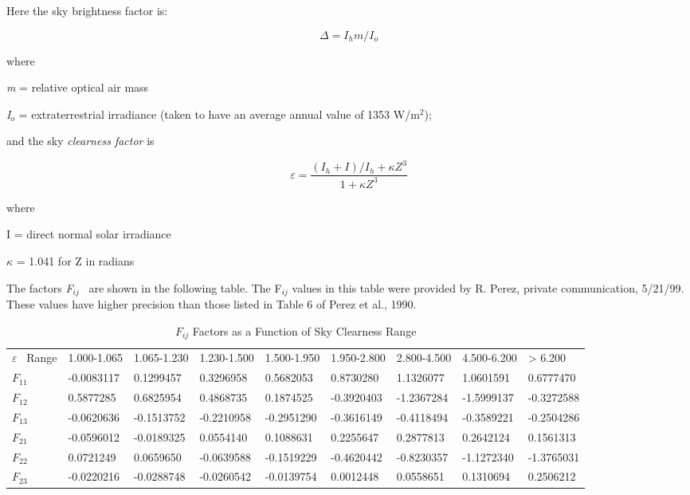 Here the sky brightness factor is:

\begin{equation}
\Delta  = {I_h}m/{I_o}
\end{equation}

where

\emph{m} = relative optical air mass

\emph{I\(_{o}\)} = extraterrestrial irradiance (taken to have an average annual value of 1353 W/m\(^{2}\));

and the sky \emph{clearness factor} is

\begin{equation}
\varepsilon  = \frac{{({I_h} + I)/{I_h} + \kappa {Z^3}}}{{1 + \kappa {Z^3}}}
\end{equation}

where

I = direct normal solar irradiance

$\kappa$ = 1.041 for Z in radians

The factors \emph{F\(_{ij}\)} ~are shown in the following table. The F\(_{ij}\) values in this table were provided by R. Perez, private communication, 5/21/99. These values have higher precision than those listed in Table 6 of Perez et al., 1990.

{\scriptsize
\begin{longtable}[c]{p{0.4in}p{0.6in}p{0.6in}p{0.6in}p{0.6in}p{0.6in}p{0.6in}p{0.6in}p{0.6in}}

\caption{$F_{ij}$ Factors as a Function of Sky Clearness Range \label{table:fij-factors-as-a-function-of-sky-clearness}} \tabularnewline
\toprule 
\endfirsthead

\caption[]{$F_{ij}$ Factors as a Function of Sky Clearness Range} \tabularnewline
\toprule 
\endhead

$\varepsilon$~ Range & 1.000-1.065 & 1.065-1.230 & 1.230-1.500 & 1.500-1.950 & 1.950-2.800 & 2.800-4.500 & 4.500-6.200 & >  6.200 \tabularnewline \midrule
$F_{11}$ & -0.0083117 & 0.1299457 & 0.3296958 & 0.5682053 & 0.8730280 & 1.1326077 & 1.0601591 & 0.6777470 \tabularnewline \midrule
$F_{12}$ & 0.5877285 & 0.6825954 & 0.4868735 & 0.1874525 & -0.3920403 & -1.2367284 & -1.5999137 & -0.3272588 \tabularnewline \midrule
$F_{13}$ & -0.0620636 & -0.1513752 & -0.2210958 & -0.2951290 & -0.3616149 & -0.4118494 & -0.3589221 & -0.2504286 \tabularnewline \midrule
$F_{21}$ & -0.0596012 & -0.0189325 & 0.0554140 & 0.1088631 & 0.2255647 & 0.2877813 & 0.2642124 & 0.1561313 \tabularnewline \midrule
$F_{22}$ & 0.0721249 & 0.0659650 & -0.0639588 & -0.1519229 & -0.4620442 & -0.8230357 & -1.1272340 & -1.3765031 \tabularnewline \midrule
$F_{23}$ & -0.0220216 & -0.0288748 & -0.0260542 & -0.0139754 & 0.0012448 & 0.0558651 & 0.1310694 & 0.2506212 \tabularnewline \midrule
\bottomrule
\end{longtable}}


